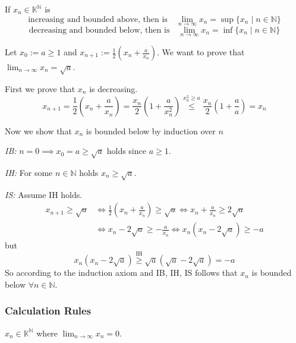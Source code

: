 \begin{theorem}\label{thm:incr_bound_conv}
   If \(x_n \in \mathbb{K}^\mathbb{N}\) is
   \[\text{increasing and bounded above, then is} \quad \lim_{n \to \infty} x_n = \sup\{x_n \mid n \in \mathbb{N}\}\]
   \[\text{decreasing and bounded below, then is} \quad \lim_{n \to \infty} x_n = \inf\{x_n \mid n \in \mathbb{N}\}\]
\end{theorem}
\begin{example}
   Let \(x_0 := a \geq 1\) and \(x_{n+1} := \frac{1}{2} \left(x_n + \frac{a}{x_n}\right)\).
   We want to prove that \(\lim_{n \to \infty} x_n = \sqrt{a}\).

   First we prove that \(x_n\) is decreasing.
   \[x_{n+1} = \frac{1}{2} \left(x_n + \frac{a}{x_n}\right) = \frac{x_n}{2} \left(1 + \frac{a}{x_n^2}\right) \overset{x_n^2 \geq a}{\leq} \frac{x_n}{2} \left(1 + \frac{a}{a}\right) = x_n\]

   Now we show that \(x_n\) is bounded below by induction over \(n\)

   \textit{IB:} \(n = 0 \implies x_0 = a \geq \sqrt{a}\) holds since \(a \geq 1\).

   \textit{IH:} For some \(n \in \mathbb{N}\) holds \(x_n \geq \sqrt{a}\).

   \textit{IS:} Assume IH holds.
   \begin{equation*}
      \begin{split}
         x_{n+1} \geq \sqrt{a} & \iff \frac{1}{2} \left(x_n + \frac{a}{x_n}\right) \geq \sqrt{a} \iff x_n + \frac{a}{x_n} \geq 2 \sqrt{a}\\
                               & \iff x_n - 2\sqrt{a} \geq - \frac{a}{x_n} \iff x_n(x_n - 2\sqrt{a}) \geq -a
      \end{split}
   \end{equation*}
   but
   \[x_n(x_n - 2 \sqrt{a}) \overset{\text{IH}}{\geq} \sqrt{a}(\sqrt{a} - 2 \sqrt{a}) = -a\]
   So according to the induction axiom and IB, IH, IS follows that \(x_n\) is bounded below \(\forall n \in \mathbb{N}\).
\end{example}

\subsubsection{Calculation Rules}
\begin{definition}
   \(x_n \in \mathbb{K}^\mathbb{N}\) where \(\lim_{n \to \infty} x_n = 0\).
\end{definition}

